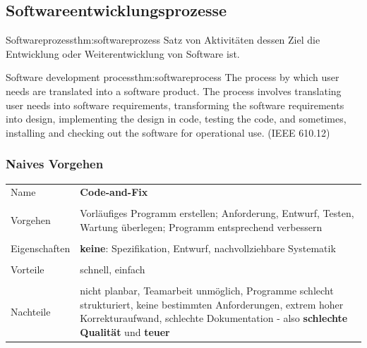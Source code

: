 \documentclass[main.tex]{subfiles}
\begin{document}
\subsection*{Softwareentwicklungsprozesse}
\begin{myTheorem}{Softwareprozess}{thm:softwareprozess}
Satz von Aktivitäten dessen Ziel die Entwicklung oder
Weiterentwicklung von Software ist.
\end{myTheorem}
\begin{myTheorem}{Software development process}{thm:softwareprocess}
The process by which user needs are translated
into a software product. The process involves translating user needs into software
requirements, transforming the software requirements into design, implementing
the design in code, testing the code, and sometimes, installing and checking out the
software for operational use. (IEEE 610.12)
\end{myTheorem}
\subsubsection*{Naives Vorgehen}
\begin{table}[H]
    \centering
    \begin{tabular}{p{2cm} p{13.5cm}}
           \scriptsize{Name} & \textbf{Code-and-Fix}  \\ \\
       \scriptsize{Vorgehen}  & Vorläufiges Programm erstellen; Anforderung, Entwurf, Testen, Wartung überlegen; Programm entsprechend verbessern \\ \\
       \scriptsize{Eigenschaften} & \textbf{keine}: Spezifikation, Entwurf, nachvollziehbare Systematik \\  \\
       \scriptsize{Vorteile} & schnell, einfach\\ \\
       \scriptsize{Nachteile} & nicht planbar, Teamarbeit unmöglich, Programme schlecht strukturiert, keine bestimmten Anforderungen, extrem hoher Korrekturaufwand, schlechte Dokumentation - also \textbf{schlechte Qualität} und \textbf{teuer}
    \end{tabular}
\end{table}
\end{document}
